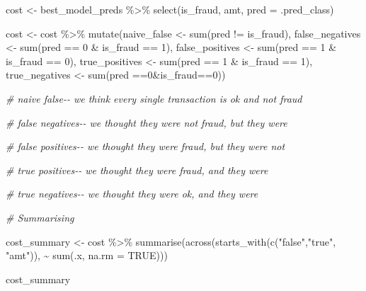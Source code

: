 \documentclass[
]{article}
\newenvironment{Shaded}{\begin{snugshade}}{\end{snugshade}}
\newcommand{\AttributeTok}[1]{\textcolor[rgb]{0.77,0.63,0.00}{#1}}
\newcommand{\CommentTok}[1]{\textcolor[rgb]{0.56,0.35,0.01}{\textit{#1}}}
\newcommand{\ConstantTok}[1]{\textcolor[rgb]{0.00,0.00,0.00}{#1}}
\newcommand{\DecValTok}[1]{\textcolor[rgb]{0.00,0.00,0.81}{#1}}
\newcommand{\FunctionTok}[1]{\textcolor[rgb]{0.00,0.00,0.00}{#1}}
\newcommand{\NormalTok}[1]{#1}
\newcommand{\OtherTok}[1]{\textcolor[rgb]{0.56,0.35,0.01}{#1}}
\newcommand{\SpecialCharTok}[1]{\textcolor[rgb]{0.00,0.00,0.00}{#1}}
\newcommand{\StringTok}[1]{\textcolor[rgb]{0.31,0.60,0.02}{#1}}
\begin{document}
\begin{Shaded}
\begin{Highlighting}[]
\NormalTok{cost }\OtherTok{\textless{}{-}}\NormalTok{ best\_model\_preds }\SpecialCharTok{\%\textgreater{}\%}
  \FunctionTok{select}\NormalTok{(is\_fraud, amt, }\AttributeTok{pred =}\NormalTok{ .pred\_class) }

\NormalTok{cost }\OtherTok{\textless{}{-}}\NormalTok{ cost }\SpecialCharTok{\%\textgreater{}\%}
  \FunctionTok{mutate}\NormalTok{(naive\_false }\OtherTok{\textless{}{-}} \FunctionTok{sum}\NormalTok{(pred }\SpecialCharTok{!=}\NormalTok{ is\_fraud),}
\NormalTok{false\_negatives }\OtherTok{\textless{}{-}} \FunctionTok{sum}\NormalTok{(pred }\SpecialCharTok{==} \DecValTok{0} \SpecialCharTok{\&}\NormalTok{ is\_fraud }\SpecialCharTok{==} \DecValTok{1}\NormalTok{),}
\NormalTok{false\_positives }\OtherTok{\textless{}{-}} \FunctionTok{sum}\NormalTok{(pred }\SpecialCharTok{==} \DecValTok{1} \SpecialCharTok{\&}\NormalTok{ is\_fraud }\SpecialCharTok{==} \DecValTok{0}\NormalTok{),}
\NormalTok{true\_positives }\OtherTok{\textless{}{-}} \FunctionTok{sum}\NormalTok{(pred }\SpecialCharTok{==} \DecValTok{1} \SpecialCharTok{\&}\NormalTok{ is\_fraud }\SpecialCharTok{==} \DecValTok{1}\NormalTok{),}
\NormalTok{true\_negatives }\OtherTok{\textless{}{-}} \FunctionTok{sum}\NormalTok{(pred }\SpecialCharTok{==}\DecValTok{0}\SpecialCharTok{\&}\NormalTok{is\_fraud}\SpecialCharTok{==}\DecValTok{0}\NormalTok{))}
  

  \CommentTok{\# naive false{-}{-} we think every single transaction is ok and not fraud}


  \CommentTok{\# false negatives{-}{-} we thought they were not fraud, but they were}

  
  
  \CommentTok{\# false positives{-}{-} we thought they were fraud, but they were not}

  
    
  \CommentTok{\# true positives{-}{-} we thought they were fraud, and they were }


  
  \CommentTok{\# true negatives{-}{-} we thought they were ok, and they were }

  
\CommentTok{\# Summarising}

\NormalTok{cost\_summary }\OtherTok{\textless{}{-}}\NormalTok{ cost }\SpecialCharTok{\%\textgreater{}\%} 
  \FunctionTok{summarise}\NormalTok{(}\FunctionTok{across}\NormalTok{(}\FunctionTok{starts\_with}\NormalTok{(}\FunctionTok{c}\NormalTok{(}\StringTok{"false"}\NormalTok{,}\StringTok{"true"}\NormalTok{, }\StringTok{"amt"}\NormalTok{)), }
            \SpecialCharTok{\textasciitilde{}} \FunctionTok{sum}\NormalTok{(.x, }\AttributeTok{na.rm =} \ConstantTok{TRUE}\NormalTok{)))}

\NormalTok{cost\_summary}
\end{Highlighting}
\end{Shaded}
\end{document}
